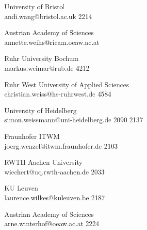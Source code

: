 \begin{multicols}{2}
 {University of Bristol\\}%
 {andi.wang@bristol.ac.uk}%
 {2214} %
 {} %
 {} %
 {} %
 {} %

 {Austrian Academy of Sciences\\}%
 {annette.weihs@ricam.oeaw.ac.at}%
 {} %
 {} %
 {} %
 {} %
 {} %

 {Ruhr University Bochum\\}%
 {markus.weimar@rub.de}%
 {4212} %
 {} %
 {} %
 {} %
 {} %

 {Ruhr West University of Applied Sciences\\}%
 {christian.weiss@hs-ruhrwest.de}%
 {4584} %
 {} %
 {} %
 {} %
 {} %

 {University of Heidelberg\\}%
 {simon.weissmann@uni-heidelberg.de}%
 {2090} %
 {2137} %
 {} %
 {} %
 {} %

 {Fraunhofer ITWM\\}%
 {joerg.wenzel@itwm.fraunhofer.de}%
 {2103} %
 {} %
 {} %
 {} %
 {} %

 {RWTH Aachen University\\}%
 {wiechert@uq.rwth-aachen.de}%
 {2033} %
 {} %
 {} %
 {} %
 {} %

 {KU Leuven\\}%
 {laurence.wilkes@kuleuven.be}%
 {2187} %
 {} %
 {} %
 {} %
 {} %

 {Austrian Academy of Sciences\\}%
 {arne.winterhof@oeaw.ac.at}%
 {2224} %
 {} %
 {} %
 {} %
 {} %


\end{multicols}

